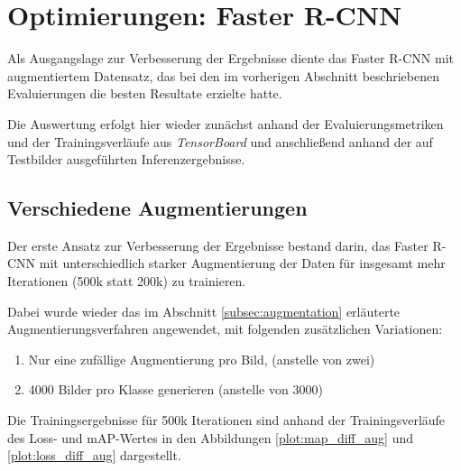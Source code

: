 \section{Optimierungen: Faster R-CNN}
\label{sec:optimierung_faster_rcnn}

Als Ausgangslage zur Verbesserung der Ergebnisse diente 
das Faster R-CNN mit augmentiertem Datensatz, das bei 
den im vorherigen Abschnitt beschriebenen Evaluierungen 
die besten Resultate erzielte hatte.

Die Auswertung erfolgt hier wieder zunächst 
anhand der Evaluierungsmetriken und der Trainingsverläufe
aus \textit{TensorBoard} und anschließend anhand der
auf Testbilder ausgeführten Inferenzergebnisse.


\subsection{Verschiedene Augmentierungen}

Der erste Ansatz zur Verbesserung der Ergebnisse bestand darin,
das Faster R-CNN mit unterschiedlich starker Augmentierung
der Daten für insgesamt mehr Iterationen
(500k statt 200k) zu trainieren.

Dabei wurde wieder das im Abschnitt \ref{subsec:augmentation} 
erläuterte Augmentierungsverfahren angewendet, mit folgenden
zusätzlichen Variationen:

\begin{enumerate}
  \item Nur eine zufällige Augmentierung pro Bild, (anstelle von zwei)
  \item 4000 Bilder pro Klasse generieren (anstelle von 3000) 
\end{enumerate}

Die Trainingsergebnisse für 500k Iterationen sind anhand der 
Trainingsverläufe des Loss- und mAP-Wertes in den Abbildungen
\ref{plot:map_diff_aug} und \ref{plot:loss_diff_aug} dargestellt.
\vspace{1cm}

\begin{minipage}{0.5\textwidth}
  \centering
  \def\svgwidth{0.9\textwidth}
  
  \label{plot:map_diff_aug}
\end{minipage}
\begin{minipage}{0.5\textwidth}
  \centering
  \def\svgwidth{0.9\textwidth}
  
  \label{plot:loss_diff_aug}
\end{minipage}

